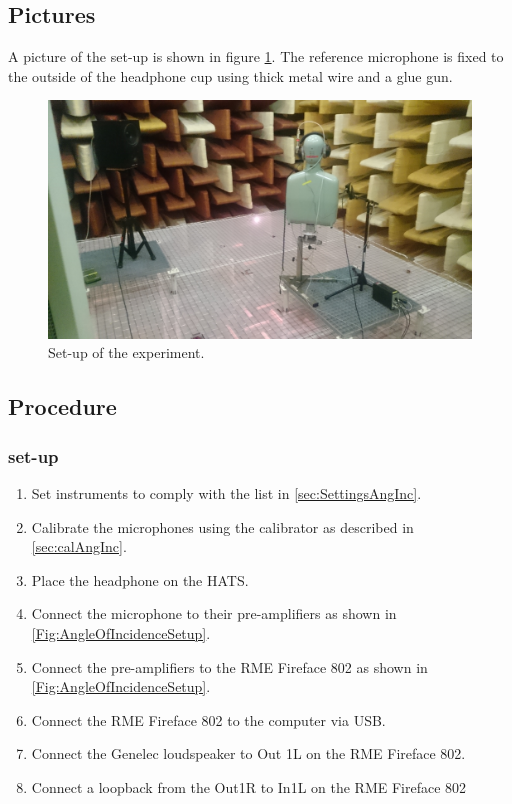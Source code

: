 \subsection{Pictures}
A picture of the set-up is shown in figure \ref{AngIncidenceSetup}. The reference microphone is fixed to the outside of the headphone cup using thick metal wire and a glue gun.  
\begin{figure}[H]
	\includegraphics[width=\textwidth]{../Journal/Experiments/AngleOfIncidence/AngInSetup.jpg}
	\caption{Set-up of the experiment.}
	\label{AngIncidenceSetup}	
\end{figure}


\subsection{Procedure}
\subsubsection{set-up}
\begin{enumerate}
	\item Set instruments to comply with the list in \ref{sec:SettingsAngInc}.
	\item Calibrate the microphones using the calibrator as described in \autoref{sec:calAngInc}.
	\item Place the headphone on the HATS.
	\item Connect the microphone to their pre-amplifiers as shown in \autoref{Fig:AngleOfIncidenceSetup}. 
	\item Connect the pre-amplifiers to the RME Fireface 802 as shown in \autoref{Fig:AngleOfIncidenceSetup}. 
	\item Connect the RME Fireface 802 to the computer via USB.
	\item Connect the Genelec loudspeaker to Out 1L on the RME Fireface 802.
	\item Connect a loopback from the Out1R to In1L on the RME Fireface 802
\end{enumerate}


